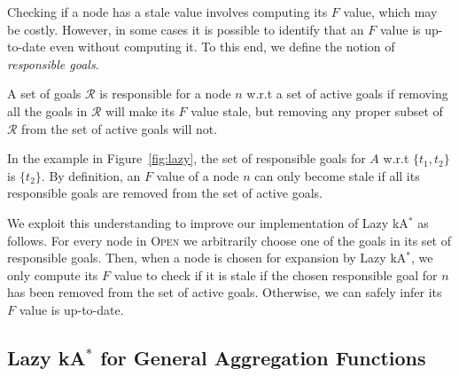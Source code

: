 \documentclass[smallextended]{svjour3}       %
\newcommand{\kastar}{kA$^*$\xspace}
\newcommand{\open}{\textsc{Open}\xspace}
\begin{document}
Checking if a node has a stale value involves computing its $F$ value, which may be costly. However, in some cases it is possible to identify that an $F$ value is up-to-date even without computing it. 
To this end, we define the notion of \emph{responsible goals}. 

\begin{definition}
A set of goals $\mathcal{R}$ is responsible for a node $n$ w.r.t a set of active goals if removing all the goals in $\mathcal{R}$ will make its $F$ value stale, but removing any proper subset of $\mathcal{R}$ from the set of active goals will not. 
\end{definition}
In the example in Figure~\ref{fig:lazy}, the set of responsible goals for $A$ w.r.t $\{t_1, t_2\}$ is $\{t_2\}$.  By definition, an $F$ value of a node $n$ can only become stale if all its responsible goals are removed from the set of active goals. 

We exploit this understanding to improve our implementation of Lazy \kastar as follows. For every node in \open we arbitrarily choose one of the goals in its set of responsible goals. 
Then, when a node is chosen for expansion by Lazy \kastar, we only compute its $F$ value to check if it is stale if the chosen responsible goal for $n$ has been removed from the set of active goals. Otherwise, we can safely infer its $F$ value is up-to-date. 






\subsection{Lazy \kastar for General Aggregation Functions}
\end{document}
